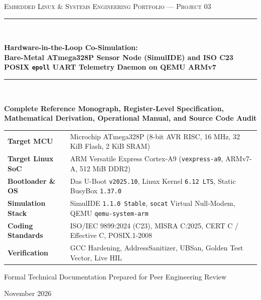\documentclass[11pt,a4paper,oneside]{report}
\begin{document}
\begin{titlepage}
\centering
\vspace*{1.5cm}
{\large\scshape\color{accent} Embedded Linux \& Systems Engineering Portfolio --- Project 03\par}
\vspace{0.8cm}
\rule{\linewidth}{1.5pt}\\[0.6cm]
{\Huge\bfseries\color{primary} Hardware-in-the-Loop Co-Simulation:\\
Bare-Metal ATmega328P Sensor Node (SimulIDE) and ISO C23 POSIX \texttt{epoll} UART Telemetry Daemon on QEMU ARMv7\par}
\vspace{0.6cm}
\rule{\linewidth}{1.5pt}\\[1.4cm]

{\Large\bfseries Complete Reference Monograph, Register-Level Specification,\\
Mathematical Derivation, Operational Manual, and Source Code Audit\par}
\vspace{1.5cm}

\begin{tabularx}{0.88\linewidth}{l X}
\toprule
\textbf{Target MCU} & Microchip ATmega328P (8-bit AVR RISC, 16 MHz, 32 KiB Flash, 2 KiB SRAM) \\
\textbf{Target Linux SoC} & ARM Versatile Express Cortex-A9 (\texttt{vexpress-a9}, ARMv7-A, 512 MiB DDR2) \\
\textbf{Bootloader \& OS} & Das U-Boot \texttt{v2025.10}, Linux Kernel \texttt{6.12 LTS}, Static BusyBox \texttt{1.37.0} \\
\textbf{Simulation Stack} & SimulIDE \texttt{1.1.0 Stable}, \texttt{socat} Virtual Null-Modem, QEMU \texttt{qemu-system-arm} \\
\textbf{Coding Standards} & ISO/IEC 9899:2024 (C23), MISRA C:2025, CERT C / Effective C, POSIX.1-2008 \\
\textbf{Verification} & GCC Hardening, AddressSanitizer, UBSan, Golden Test Vector, Live HIL \\
\bottomrule
\end{tabularx}

\vfill
{\large Formal Technical Documentation Prepared for Peer Engineering Review\par}
\vspace{0.3cm}
{\normalsize November 2026\par}
\end{titlepage}
\end{document}
